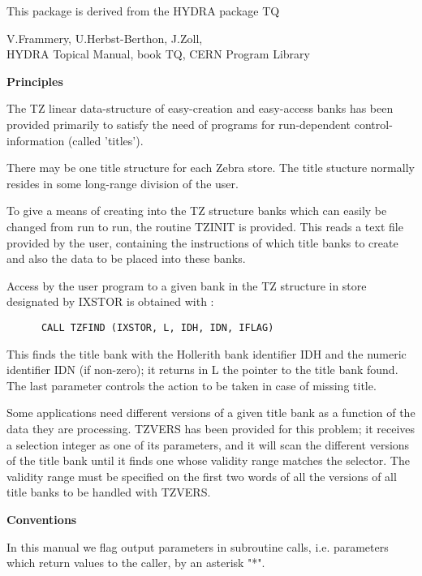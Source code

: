 This package is derived from the HYDRA package TQ

V.Frammery, U.Herbst-Berthon, J.Zoll,\\
HYDRA Topical Manual, book TQ, CERN Program Library
\cleardoublepage  %
\vspace*{20pt}
\lile{10mm}
\begin{center} {\large\bf{Principles}} \end{center}

The TZ linear data-structure of easy-creation and easy-access
banks has been provided primarily to satisfy the need of
programs for run-dependent control-information
(called 'titles').

There may be one title structure for each Zebra store.
The title stucture normally resides in some
long-range division of the user.

To give a means of creating into the TZ structure banks which
can easily be changed from run to run,
the routine TZINIT is provided.
This reads a text file provided by the user,
containing the instructions of which title banks to create
and also the data to be placed into these banks.

Access by the user program to a given bank in the TZ structure
in store designated by IXSTOR is obtained with :

\verb"      CALL TZFIND (IXSTOR, L, IDH, IDN, IFLAG)"

This finds the title bank with the Hollerith bank identifier IDH
and the numeric identifier IDN (if non-zero);
it returns in L the pointer to the title bank found.
The last parameter controls the action to be taken
in case of missing title.

Some applications need different versions of a given title bank
as a function of the data they are processing.
TZVERS has been provided for this problem; it receives a selection
integer as one of its parameters, and it will scan the different
versions of the title bank until it finds one whose validity range
matches the selector.
The validity range must be specified on the first two words of
all the versions of all title banks to be handled with TZVERS.

\vspace*{20pt}
\begin{center} {\large\bf Conventions} \end{center}

In this manual we flag output parameters in subroutine calls,
i.e. parameters which return values to the caller,
by an asterisk "*".

